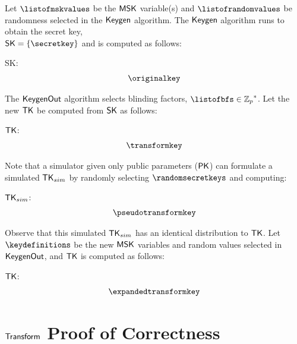 \documentclass[11pt]{article}
\begin{document}
Let $\listofmskvalues$ be the $\mathsf{MSK}$ variable(s) and $\listofrandomvalues$ be randomness selected in the $\mathsf{Keygen}$ algorithm. The $\mathsf{Keygen}$ algorithm runs to obtain the secret key, \\ $\SK = \{\secretkey\}$ and is computed as follows:

\begin{description}
\item {\sf SK}: \begin{multline*}  \originalkey \end{multline*}
\end{description}

\noindent
The $\mathsf{KeygenOut}$ algorithm selects blinding factors, $\listofbfs \in \Zp^*$. Let the new $\mathsf{TK}$ be computed from $\mathsf{SK}$ as follows:

\begin{description}
\item {\sf $\mathsf{TK}$}: \begin{multline*}  \transformkey \end{multline*}
\end{description}

\noindent
Note that a simulator given only public parameters ($\mathsf{PK}$) can formulate a simulated ${\sf TK}_{sim}$ by randomly selecting $\randomsecretkeys$ and computing: 

\begin{description}
\item {\sf ${\sf TK}_{sim}$}: \begin{multline*}  \pseudotransformkey \end{multline*}
\end{description}

Observe that this simulated ${\sf TK}_{sim}$ has an identical distribution to $\mathsf{TK}$.  Let $\keydefinitions$ be the new $\mathsf{MSK}$ variables and random values selected in $\mathsf{KeygenOut}$, and $\mathsf{TK}$ is computed as follows:

\begin{description}
\item {\sf $\mathsf{TK}$}: \begin{multline*}  \expandedtransformkey \end{multline*} 
\end{description}

\section{$\mathsf{Transform}$ Proof of Correctness}
\end{document}
